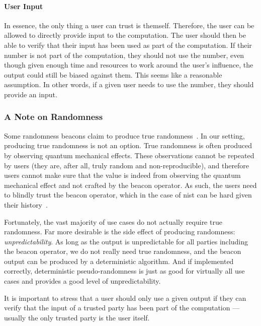 \paragraph{User Input} In essence, the only thing a user can trust is themself.
Therefore, the user can be allowed to directly provide input to the computation.
The user should then be able to verify that their input has been used as part of the computation.
If their number is not part of the computation, they should not use the number, even though given enough time and resources to work around the user's influence, the output could still be biased against them.
This seems like a reasonable assumption.
In other words, if a given user needs to use the number, they should provide an input.

\subsubsection{A Note on Randomness}
Some randomness beacons claim to produce true randomness~\cite{nistbeacon}.
In our setting, producing true randomness is not an option.
True randomness is often produced by observing quantum mechanical effects.
These observations cannot be repeated by users (they are, after all, truly random and non-reproducible), and therefore users cannot make sure that the value is indeed from observing the quantum mechanical effect and not crafted by the beacon operator.
As such, the users need to blindly trust the beacon operator, which in the case of \gls{nist} can be hard given their history~\cite{nytimes-nsabackdoors, nytimes-nsaconstants, nist2014backdoor}.

Fortunately, the vast majority of use cases do not actually require true randomness.
Far more desirable is the side effect of producing randomness: \emph{unpredictability}.
As long as the output is unpredictable for all parties including the beacon operator, we do not really need true randomness, and the beacon output can be produced by a deterministic algorithm.
And if implemented correctly, deterministic pseudo-randomness is just as good for virtually all use cases and provides a good level of unpredictability.

It is important to stress that a user should only use a given output if they can verify that the input of a trusted party has been part of the computation --- usually the only trusted party is the user itself.


